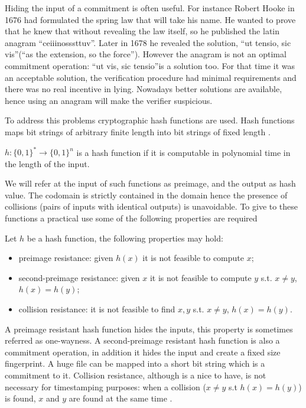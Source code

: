 Hiding the input of a commitment is often useful. For instance Robert Hooke \cite{Petroski96invention} in 1676 had formulated the spring law that will take his name. He wanted to prove that he knew that without revealing the law itself, so he published the latin anagram \textquotedblleft ceiiinosssttuv\textquotedblright. Later in 1678 he revealed the solution, \textquotedblleft ut tensio, sic vis\textquotedblright (\textquotedblleft as the extension, so the force\textquotedblright). However the anagram is not an optimal commitment operation: \textquotedblleft ut vis, sic tensio\textquotedblright is a solution too. For that time it was an acceptable solution, the verification procedure had minimal requirements and there was no real incentive in lying. Nowadays better solutions are available, hence using an anagram will make the verifier suspicious.

To address this problems cryptographic hash functions are used. Hash functions maps bit strings of arbitrary finite length into bit strings of fixed length \cite{Damgard:1989:DPH:118209.118248}. 
\begin{mydef}
	$h : \{ 0, 1 \} ^* \rightarrow \{ 0, 1 \} ^n $ is a hash function if it is computable in polynomial time in the length of the input.
\end{mydef}
We will refer at the input of such functions as preimage, and the output as hash value. The codomain is strictly contained in the domain hence the presence of collisions (pairs of inputs with identical outputs) is unavoidable. 
To give to these functions a practical use some of the following properties are required
\begin{mydef}
	\label{hash-prop}
	Let $h$ be a hash function, the following properties may hold:
	\begin{itemize}
		\item preimage resistance: given $h(x)$ it is not feasible to compute $x$;
		\item second-preimage resistance: given $x$ it is not feasible to compute $y$ s.t. $x \neq y$, $h(x)=h(y)$;
		\item collision resistance: it is not feasible to find $x, y$ s.t. $x \neq y$, $h(x)=h(y)$.
	\end{itemize}
\end{mydef}

A preimage resistant hash function hides the inputs, this property is sometimes referred as one-wayness.
A second-preimage resistant hash function is also a commitment operation, in addition it hides the input and create a fixed size fingerprint. A huge file can be mapped into a short bit string which is a commitment to it.
Collision resistance, although is a nice to have, is not necessary for timestamping purposes: when a collision ($x \neq y$ s.t $h(x)=h(y)$) is found, $x$ and $y$ are found at the same time \cite{SHA1}.

